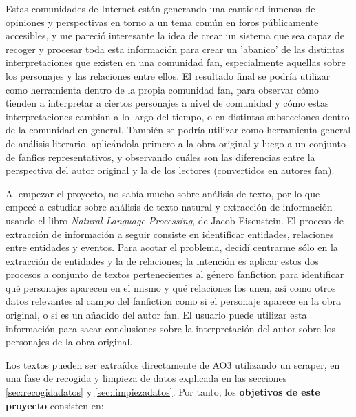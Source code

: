 \documentclass{pre-tfg}
\begin{document}
Estas comunidades de Internet están generando una cantidad inmensa de opiniones y perspectivas en torno a un tema común en foros públicamente accesibles, y me pareció interesante la idea de crear un sistema que sea capaz de recoger y procesar toda esta información para crear un 'abanico' de las distintas interpretaciones que existen en una comunidad fan, especialmente aquellas sobre los personajes y las relaciones entre ellos. El resultado final se podría utilizar como herramienta dentro de la propia comunidad fan, para observar cómo tienden a interpretar a ciertos personajes a nivel de comunidad y cómo estas interpretaciones cambian a lo largo del tiempo, o en distintas subsecciones dentro de la comunidad en general. También se podría utilizar como herramienta general de análisis literario, aplicándola primero a la obra original y luego a un conjunto de fanfics representativos, y observando cuáles son las diferencias entre la perspectiva del autor original y la de los lectores (convertidos en autores fan).

Al empezar el proyecto, no sabía mucho sobre análisis de texto, por lo que empecé a estudiar sobre análisis de texto natural y extracción de información usando el libro \textit{Natural Language Processing}, de Jacob Eisenstein\cite{jacob}. El proceso de extracción de información a seguir consiste en identificar entidades, relaciones entre entidades y eventos. Para acotar el problema, decidí centrarme sólo en la extracción de entidades y la de relaciones; la intención es aplicar estos dos procesos a conjunto de textos pertenecientes al género fanfiction para identificar qué personajes aparecen en el mismo y qué relaciones los unen, así como otros datos relevantes al campo del fanfiction como si el personaje aparece en la obra original, o si es un añadido del autor fan. El usuario puede utilizar esta información para sacar conclusiones sobre la interpretación del autor sobre los personajes de la obra original.

Los textos pueden ser extraídos directamente de AO3 utilizando un scraper, en una fase de recogida y limpieza de datos explicada en las secciones \ref{sec:recogidadatos} y \ref{sec:limpiezadatos}. Por tanto, los \textbf{objetivos de este proyecto} consisten en:
\end{document}
